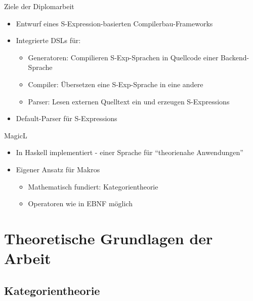 \documentclass{beamer}
\begin{document}
\begin{frame}{Ziele der Diplomarbeit}
  \begin{itemize}
  \item Entwurf eines S-Expression-basierten Compilerbau-Frameworks
  \item Integrierte DSLs für:
    \begin{itemize}
    \item Generatoren: Compilieren S-Exp-Sprachen in Quellcode einer Backend-Sprache
    \item Compiler: Übersetzen eine S-Exp-Sprache in eine andere
    \item Parser: Lesen externen Quelltext ein und erzeugen S-Expressions
    \end{itemize}
  \item Default-Parser für S-Expressions
  \end{itemize}
\end{frame}


\begin{frame}{MagicL}
  \begin{itemize}
  \item In Haskell implementiert - einer Sprache für ``theorienahe Anwendungen''
  \item Eigener Ansatz für Makros
    \begin{itemize}
    \item Mathematisch fundiert: Kategorientheorie
    \item Operatoren wie in EBNF möglich
    \end{itemize}  
  \end{itemize}
\end{frame}

\section[Grundlagen]{Theoretische Grundlagen der Arbeit}
\subsection{Kategorientheorie}

\end{document}
